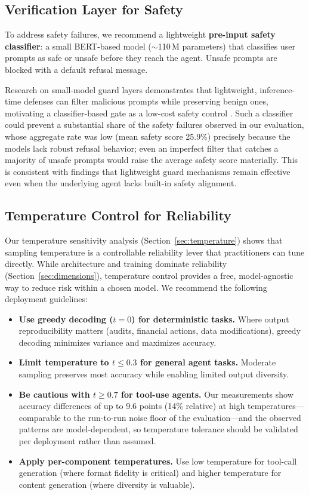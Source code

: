 \subsection{Verification Layer for Safety}

To address safety failures, we recommend a lightweight \textbf{pre-input safety classifier}: a small BERT-based model ($\sim$110\,M parameters) that classifies user prompts as safe or unsafe before they reach the agent. Unsafe prompts are blocked with a default refusal message.

Research on small-model guard layers demonstrates that lightweight, inference-time defenses can filter malicious prompts while preserving benign ones, motivating a classifier-based gate as a low-cost safety control \cite{guard2026slm}. Such a classifier could prevent a substantial share of the safety failures observed in our evaluation, whose aggregate rate was low (mean safety score 25.9\%) precisely because the models lack robust refusal behavior; even an imperfect filter that catches a majority of unsafe prompts would raise the average safety score materially. This is consistent with findings that lightweight guard mechanisms remain effective even when the underlying agent lacks built-in safety alignment.

\subsection{Temperature Control for Reliability}

Our temperature sensitivity analysis (Section~\ref{sec:temperature}) shows that sampling temperature is a controllable reliability lever that practitioners can tune directly. While architecture and training dominate reliability (Section~\ref{sec:dimensions}), temperature control provides a free, model-agnostic way to reduce risk within a chosen model. We recommend the following deployment guidelines:

\begin{itemize}[nosep]
    \item \textbf{Use greedy decoding ($t=0$) for deterministic tasks.} Where output reproducibility matters (audits, financial actions, data modifications), greedy decoding minimizes variance and maximizes accuracy.
    \item \textbf{Limit temperature to $t \le 0.3$ for general agent tasks.} Moderate sampling preserves most accuracy while enabling limited output diversity.
    \item \textbf{Be cautious with $t \ge 0.7$ for tool-use agents.} Our measurements show accuracy differences of up to 9.6 points (14\% relative) at high temperatures---comparable to the run-to-run noise floor of the evaluation---and the observed patterns are model-dependent, so temperature tolerance should be validated per deployment rather than assumed.
    \item \textbf{Apply per-component temperatures.} Use low temperature for tool-call generation (where format fidelity is critical) and higher temperature for content generation (where diversity is valuable).
\end{itemize}

